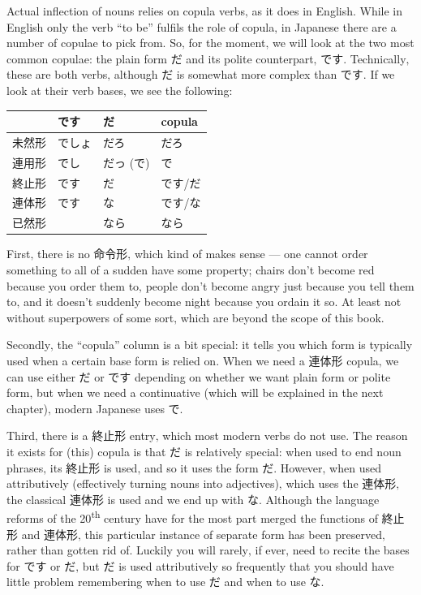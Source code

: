 \documentclass[11pt, b5paper, twoside, openright, onecolumn]{book}
\newenvironment{mytabular}[1]{\noindent\hspace{0.4in}
\begin{tabular}[h]{#1}}{\end{tabular}}
\begin{document}
Actual inflection of nouns relies on copula verbs‚ as it does in English. While in English only the verb “to be” fulfils the role of copula‚ in Japanese there are a number of copulae to pick from. So‚ for the moment‚ we will look at the two most common copulae: the plain form だ and its polite counterpart‚ です. Technically‚ these are both verbs‚ although だ is somewhat more complex than です. If we look at their verb bases‚ we see the following:

\vspace{0.5cm}
\smaller
\begin{mytabular}{| l  l  l  l |}\hline 
\rule{0pt}{2.4ex} & です & だ & copula\\ 
\hline
\rule{0pt}{2.4ex}未然形 & でしょ & だろ & だろ\\ 
\rule{0pt}{2.4ex}連用形 & でし & だっ (で) & で\\ 
\rule{0pt}{2.4ex}終止形 & です & だ & です/だ\\ 
\rule{0pt}{2.4ex}連体形 & です & な & です/な\\ 
\rule{0pt}{2.4ex}已然形 &  & なら & なら\\ 
\hline 
\end{mytabular}
\larger
\vspace{0.5cm}


First‚ there is no 命令形‚ which kind of makes sense — one cannot order something to all of a sudden have some property; chairs don’t become red because you order them to‚ people don’t become angry just because you tell them to‚ and it doesn’t suddenly become night because you ordain it so. At least not without superpowers of some sort‚ which are beyond the scope of this book.

Secondly‚ the “copula” column is a bit special: it tells you which form is typically used when a certain base form is relied on. When we need a 連体形 copula‚ we can use either だ or です depending on whether we want plain form or polite form‚ but when we need a continuative (which will be explained in the next chapter)‚ modern Japanese uses で.

Third‚ there is a 終止形 entry‚ which most modern verbs do not use. The reason it exists for (this) copula is that だ is relatively special: when used to end noun phrases‚ its 終止形 is used‚ and so it uses the form だ. However‚ when used attributively (effectively turning nouns into adjectives)‚ which uses the 連体形‚ the classical 連体形 is used and we end up with な. Although the language reforms of the 20\textsuperscript{th} century have for the most part merged the functions of 終止形 and 連体形‚ this particular instance of separate form has been preserved‚ rather than gotten rid of. Luckily you will rarely‚ if ever‚ need to recite the bases for です or だ‚ but だ is used attributively so frequently that you should have little problem remembering when to use だ and when to use な.
\end{document}
